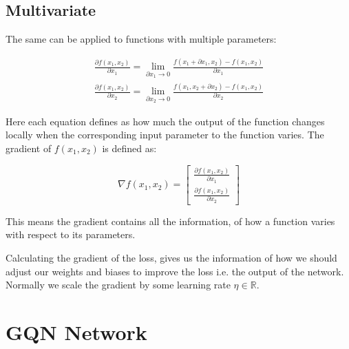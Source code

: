 \subsection{Multivariate}
The same can be applied to functions with multiple parameters:

\begin{equation}
\begin{split}
	\frac{\partial f(x_1, x_2)}{\partial x_1} = \lim_{\partial x_1 \to 0}\frac{f(x_1 + \partial x_1, x_2) - f(x_1, x_2)}{\partial x_1} \\
	\frac{\partial f(x_1, x_2)}{\partial x_2} = \lim_{\partial x_2 \to 0}\frac{f(x_1, x_2 + \partial x_2) - f(x_1, x_2)}{\partial x_2}
\end{split}
\end{equation}

Here each equation defines as how much the output of the function changes locally when the corresponding input parameter to the function varies.
The gradient of $f(x_1, x_2)$ is defined as:

\begin{equation}
\nabla f(x_1, x_2) =
	\begin{bmatrix}
	\frac{\partial f(x_1, x_2)}{\partial x_1} \\[2mm]
	\frac{\partial f(x_1, x_2)}{\partial x_2}
	\end{bmatrix}
\end{equation}

This means the gradient contains all the information, of how a function varies with respect to its parameters.

Calculating the gradient of the loss, gives us the information of how we should adjust our weights and biases to improve the loss i.e. the output of the network. Normally we scale the gradient by some learning rate $\eta \in \mathbb{R}$.




\section{GQN Network}
